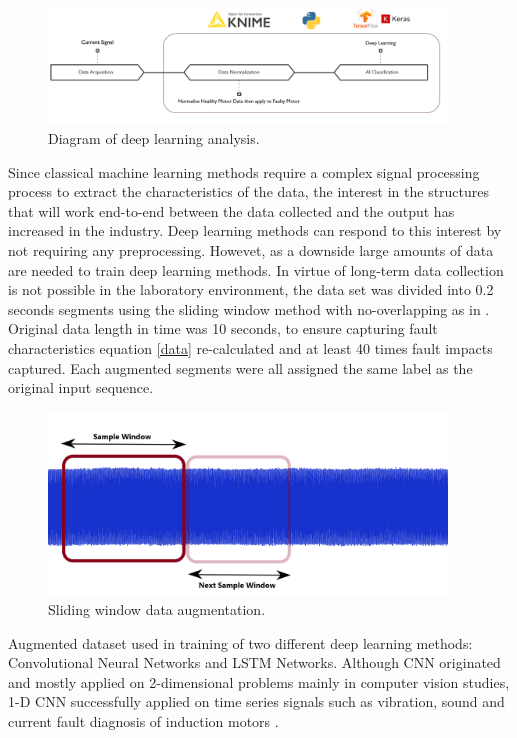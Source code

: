 \begin{figure}[h]
	\centering
	\includegraphics[width=300pt,keepaspectratio=true]{./fig/method4.PNG}
	\caption{Diagram of deep learning analysis.}	
	\label{method4}
\end{figure}

Since classical machine learning methods require a complex signal processing process to extract the characteristics of the data, the interest in the structures that will work end-to-end between the data collected and the output has increased in the industry. Deep learning methods can respond to this interest by not requiring any preprocessing. Howevet, as a downside large amounts of data are needed to train deep learning methods. In virtue of long-term data collection is not possible in the laboratory environment, the data set was divided into 0.2 seconds segments using the sliding window method with no-overlapping as in \cite{shenfield2020novel}. Original data length in time was 10 seconds, to ensure capturing fault characteristics equation \ref{data} re-calculated and at least 40 times fault impacts captured. Each augmented segments were all assigned the same label as the original input sequence.

\begin{figure}[h]
	\centering
	\includegraphics[width=300pt,keepaspectratio=true]{./fig/data.png}
	\caption{Sliding window data augmentation.}	
	\label{dataslide}
\end{figure}

Augmented dataset used in training of two different deep learning methods: Convolutional Neural Networks and LSTM Networks. Although CNN originated and mostly applied on 2-dimensional problems mainly in computer vision studies, 1-D CNN successfully applied on time series signals such as vibration, sound and current fault diagnosis of induction motors \cite{eren2017bearing,eren2019generic,qiao2020deep,skowron2020convolutional}.

